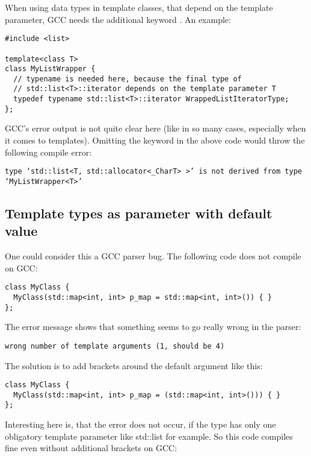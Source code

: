 When using data types in template classes, that depend on the template parameter, GCC needs the additional keyword . An example:

\begin{verbatim}
#include <list>

template<class T>
class MyListWrapper {
  // typename is needed here, because the final type of 
  // std::list<T>::iterator depends on the template parameter T
  typedef typename std::list<T>::iterator WrappedListIteratorType;
};
\end{verbatim}

GCC's error output is not quite clear here (like in so many cases, especially when it comes to templates). Omitting the keyword  in the above code would throw the following compile error:

\begin{verbatim}
type ‘std::list<T, std::allocator<_CharT> >’ is not derived from type ‘MyListWrapper<T>’
\end{verbatim}

\subsection{Template types as parameter with default value}

One could consider this a GCC parser bug. The following code does not compile on GCC:

\begin{verbatim}
class MyClass {
  MyClass(std::map<int, int> p_map = std::map<int, int>()) { }
};
\end{verbatim}

The error message shows that something seems to go really wrong in the parser:

\begin{verbatim}
wrong number of template arguments (1, should be 4)
\end{verbatim}

The solution is to add brackets around the default argument like this:

\begin{verbatim}
class MyClass {
  MyClass(std::map<int, int> p_map = (std::map<int, int>())) { }
};
\end{verbatim}

Interesting here is, that the error does not occur, if the type has only one obligatory template parameter like std::list for example. So this code compiles fine even without additional brackets on GCC:

